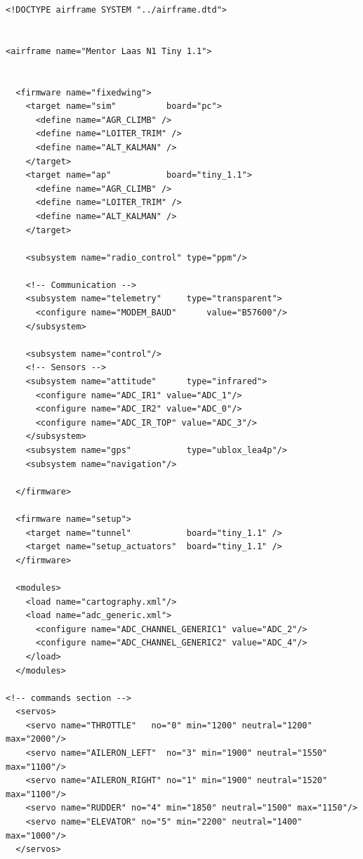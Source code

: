 \documentclass[a4paper,11pt]{report}
\begin{document}

\lstset{caption=Airframe Configuration}

\begin{lstlisting}
<!DOCTYPE airframe SYSTEM "../airframe.dtd">


<airframe name="Mentor Laas N1 Tiny 1.1">


  <firmware name="fixedwing">
    <target name="sim" 			board="pc">
      <define name="AGR_CLIMB" />
      <define name="LOITER_TRIM" />
      <define name="ALT_KALMAN" />
    </target>
    <target name="ap" 			board="tiny_1.1">
      <define name="AGR_CLIMB" />
      <define name="LOITER_TRIM" />
      <define name="ALT_KALMAN" />
    </target>

    <subsystem name="radio_control" type="ppm"/>

    <!-- Communication -->
    <subsystem name="telemetry" 	type="transparent">
      <configure name="MODEM_BAUD" 		value="B57600"/>
    </subsystem>

    <subsystem name="control"/>
    <!-- Sensors -->
    <subsystem name="attitude" 		type="infrared">
      <configure name="ADC_IR1" value="ADC_1"/>
      <configure name="ADC_IR2" value="ADC_0"/>
      <configure name="ADC_IR_TOP" value="ADC_3"/>
    </subsystem>
    <subsystem name="gps" 		    type="ublox_lea4p"/>
    <subsystem name="navigation"/>

  </firmware>

  <firmware name="setup">
    <target name="tunnel"           board="tiny_1.1" />
    <target name="setup_actuators"  board="tiny_1.1" />
  </firmware>

  <modules>
    <load name="cartography.xml"/>
    <load name="adc_generic.xml">
      <configure name="ADC_CHANNEL_GENERIC1" value="ADC_2"/>
      <configure name="ADC_CHANNEL_GENERIC2" value="ADC_4"/>
    </load>
  </modules>

<!-- commands section -->
  <servos>
    <servo name="THROTTLE"   no="0" min="1200" neutral="1200" max="2000"/>
    <servo name="AILERON_LEFT"  no="3" min="1900" neutral="1550" max="1100"/>
    <servo name="AILERON_RIGHT" no="1" min="1900" neutral="1520" max="1100"/>
    <servo name="RUDDER" no="4" min="1850" neutral="1500" max="1150"/>
    <servo name="ELEVATOR" no="5" min="2200" neutral="1400" max="1000"/>
  </servos>


\end{lstlisting}
\end{document}
